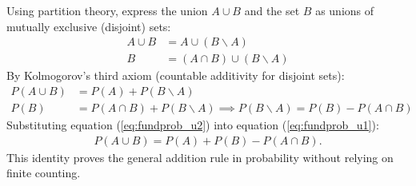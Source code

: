 \begin{solproblema}[prob:1f335a1]
	Using partition theory, express the union $A \cup B$ and the set $B$ as unions of mutually exclusive (disjoint) sets:
	\begin{align}
		A \cup B &= A \cup (B \backslash A) \\
		B &= (A \cap B) \cup (B \backslash A)
	\end{align}
	By Kolmogorov's third axiom (countable additivity for disjoint sets):
	\begin{align}
		P(A \cup B) &= P(A) + P(B \backslash A) \label{eq:fundprob_u1} \\
		P(B) &= P(A \cap B) + P(B \backslash A) \implies P(B \backslash A) = P(B) - P(A \cap B) \label{eq:fundprob_u2}
	\end{align}
	Substituting equation (\ref{eq:fundprob_u2}) into equation (\ref{eq:fundprob_u1}):
	\begin{align}
		P(A \cup B) = P(A) + P(B) - P(A \cap B).
	\end{align}
	This identity proves the general addition rule in probability without relying on finite counting.
\end{solproblema}

